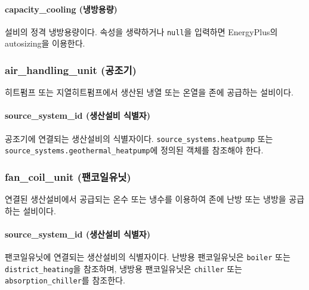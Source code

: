 \paragraph{capacity\_cooling (냉방용량)} 설비의 정격 냉방용량이다. 속성을 생략하거나 \texttt{null}을 입력하면 EnergyPlus의 autosizing을 이용한다.

\subsubsection{air\_handling\_unit (공조기)} \label{subsubsection:ioref:airhandlingunit}

히트펌프 또는 지열히트펌프에서 생산된 냉열 또는 온열을
존에 공급하는 설비이다.


\paragraph{source\_system\_id (생산설비 식별자)} 공조기에 연결되는 생산설비의 식별자이다. \texttt{source\_systems.heatpump} 또는 \texttt{source\_systems.geothermal\_heatpump}에 정의된 객체를
참조해야 한다.

\subsubsection{fan\_coil\_unit (팬코일유닛)} \label{subsubsection:ioref:fancoilunit}

연결된 생산설비에서 공급되는 온수 또는 냉수를 이용하여 존에 난방 또는 냉방을 공급하는 설비이다.


\paragraph{source\_system\_id (생산설비 식별자)} 팬코일유닛에 연결되는 생산설비의 식별자이다. 난방용 팬코일유닛은 \texttt{boiler} 또는 \texttt{district\_heating}을 참조하며, 냉방용 팬코일유닛은 \texttt{chiller} 또는 \texttt{absorption\_chiller}를 참조한다.


